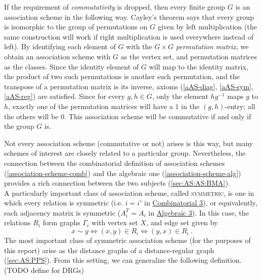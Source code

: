 \documentclass{report}
\begin{document}
    If the requirement of \textit{commutativity} is dropped, then every finite
    group $G$ is an association scheme in the following way.  Cayley's theorem
    says that every group is isomorphic to the group of permutations on $G$
    given by left multiplication (the same construction will work if right
    multiplication is used everywhere instead of left).  By identifying each
    element of $G$ with the $G \times G$ \textit{permutation matrix}, we obtain
    an association scheme with $G$ as the vertex set, and permutation matrices
    as the classes.  Since the identity element of $G$ will map to the identity
    matrix, the product of two such permutations is another such permutation,
    and the transpose of a permutation matrix is its inverse, axioms
    (\ref{aAS-diag}, \ref{aAS-sym}, \ref{aAS-reg}) are satisfied.  Since for
    every $g, h \in G$, only the element $hg^{-1}$ maps $g$ to $h$, exactly one
    of the permutation matrices will have a $1$ in the $(g, h)$-entry; all the
    others will be $0$.  This association scheme will be commutative if and only
    if the group $G$ is.

    Not every association scheme (commutative or not) arises is this way, but
    many schemes of interest are closely related to a particular group.
    Nevertheless, the connection between the combinatorial definition of
    association schemes (\ref{association-scheme-comb}) and the algebraic one
    (\ref{association-scheme-alg}) provides a rich connection between the two
    subjects (\ref{sec:AS:AS:BMA}).
    \\

    A particularly important class of association scheme, called
    \textsc{symmetric}, is one in which every relation is symmetric (i.e. $i =
    i'$ in \hyperref[cAS-sym]{Combinatorial 3}), or equivalently, each adjacency
    matrix is symmetric ($A_i^T = A_i$ in \hyperref[aAS-sym]{Algebraic 3}).
    In this case, the relations $R_i$ form graphs $\Gamma_i$ with vertex set
    $X$, and edge set given by
    $$
      x \sim y \iff (x, y) \in R_i \iff (y, x) \in R_i
      \ .
    $$
    The most important class of symmetric association scheme (for the purposes
    of this report) arise as the distance graphs of a distance-regular graph
    (\ref{sec:AS:PPS}).  From this setting, we can generalize the following
    definition.  (TODO define for DRGs)
\end{document}
